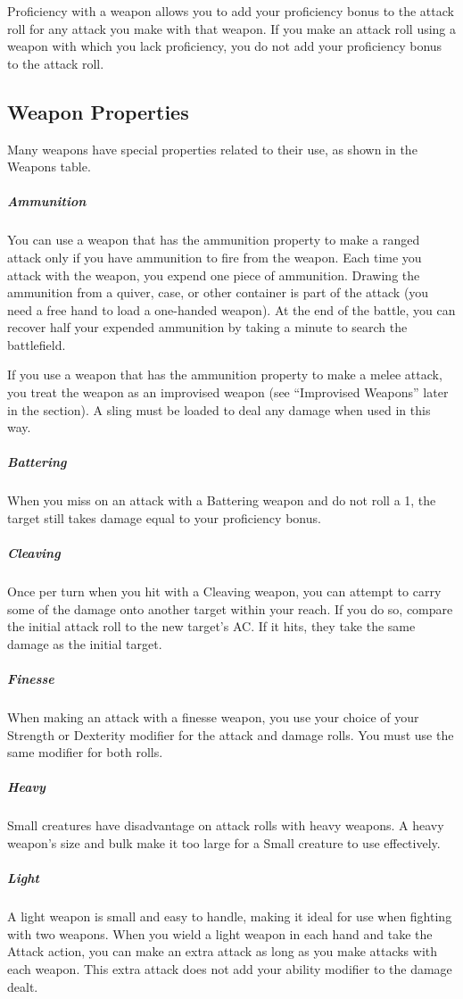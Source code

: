 Proficiency with a weapon allows you to add your proficiency bonus to the attack roll for any attack you make with that weapon. If you make an attack roll using a weapon with which you lack proficiency, you do not add your proficiency bonus to the attack roll.

\subsection{Weapon Properties}

Many weapons have special properties related to their use, as shown in the Weapons table.

\subparagraph*{Ammunition} You can use a weapon that has the ammunition property to make a ranged attack only if you have ammunition to fire from the weapon. Each time you attack with the weapon, you expend one piece of ammunition. Drawing the ammunition from a quiver, case, or other container is part of the attack (you need a free hand to load a one-handed weapon). At the end of the battle, you can recover half your expended ammunition by taking a minute to search the battlefield.

If you use a weapon that has the ammunition property to make a melee attack, you treat the weapon as an improvised weapon (see “Improvised Weapons” later in the section). A sling must be loaded to deal any damage when used in this way.

\subparagraph*{Battering} When you miss on an attack with a Battering weapon and do not roll a 1, the target still takes damage equal to your proficiency bonus.

\subparagraph*{Cleaving} Once per turn when you hit with a Cleaving weapon, you can attempt to carry some of the damage onto another target within your reach. If you do so, compare the initial attack roll to the new target's AC. If it hits, they take the same damage as the initial target.

\subparagraph*{Finesse} When making an attack with a finesse weapon, you use your choice of your Strength or Dexterity modifier for the attack and damage rolls. You must use the same modifier for both rolls.

\subparagraph*{Heavy} Small creatures have disadvantage on attack rolls with heavy weapons. A heavy weapon's size and bulk make it too large for a Small creature to use effectively. 

\subparagraph*{Light} A light weapon is small and easy to handle, making it ideal for use when fighting with two weapons. When you wield a light weapon in each hand and take the Attack action, you can make an extra attack as long as you make attacks with each weapon. This extra attack does not add your ability modifier to the damage dealt.

